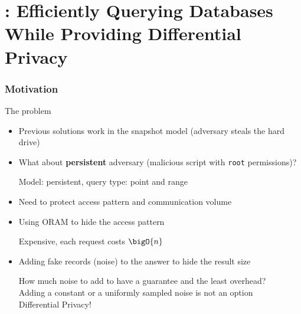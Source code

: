 \section{\epsolute{}: Efficiently Querying Databases While Providing Differential Privacy~\cite{epsolute}}

	\begin{frame}[label={frame:epsolute-motivation}]

		\frametitle{Motivation}

		\begin{block}{The problem}

			\begin{itemize}
				\item<1-> Previous solutions work in the snapshot model (adversary steals the hard drive)
				\item<1->
					What about \textbf{persistent} adversary (malicious script with \texttt{root} permissions)? \\
					\begin{small}
						Model: \alert{persistent}, query type: \alert{point} and \alert{range}
					\end{small}
				\item<1-> Need to protect \alert{access pattern} and \alert{communication volume}
				\item<2->
					Using ORAM to hide the access pattern \\
					\begin{small}
						Expensive, each request costs $\bigO{n}$ \hyperlink{frame:appendix:oram}{}
					\end{small}
				\item<3->
					Adding fake records (noise) to the answer to hide the result size \\
					\begin{small}
						How much noise to add to have a guarantee and the least overhead? \\
						Adding a constant or a uniformly sampled noise is not an option \\
						Differential Privacy!
					\end{small}
			\end{itemize}

		\end{block}

	\end{frame}

